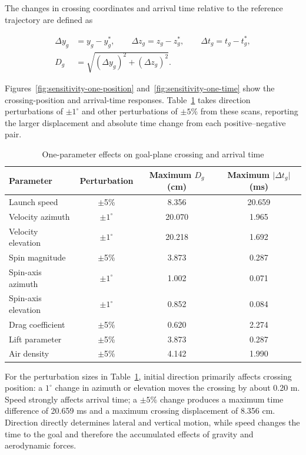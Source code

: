 \documentclass[12pt,letterpaper]{article}
\begin{document}
The changes in crossing coordinates and arrival time relative to the reference trajectory are defined as


\begin{equation}
\begin{aligned}
\Delta y_g&=y_g-y_g^*,\qquad
\Delta z_g=z_g-z_g^*,\qquad
\Delta t_g=t_g-t_g^*,\\
D_g&=\sqrt{(\Delta y_g)^2+(\Delta z_g)^2}.
\end{aligned}
\label{eq:sensitivity-displacement}
\end{equation}

Figures~\ref{fig:sensitivity-one-position} and~\ref{fig:sensitivity-one-time} show the crossing-position and arrival-time responses. Table~\ref{tab:sensitivity-one-factor} takes direction perturbations of $\pm1^\circ$ and other perturbations of $\pm5\%$ from these scans, reporting the larger displacement and absolute time change from each positive--negative pair.


\begin{table}[H]
\centering
\small
\renewcommand{\arraystretch}{1.16}
\caption{One-parameter effects on goal-plane crossing and arrival time}
\begin{tabular}{lccc}
\toprule
Parameter & Perturbation & Maximum $D_g$ (cm) & Maximum $\lvert\Delta t_g\rvert$ (ms)\\
\midrule
Launch speed & $\pm$5\% & 8.356 & 20.659\\
Velocity azimuth & $\pm$$1^\circ$ & 20.070 & 1.965\\
Velocity elevation & $\pm$$1^\circ$ & 20.218 & 1.692\\
Spin magnitude & $\pm$5\% & 3.873 & 0.287\\
Spin-axis azimuth & $\pm$$1^\circ$ & 1.002 & 0.071\\
Spin-axis elevation & $\pm$$1^\circ$ & 0.852 & 0.084\\
Drag coefficient & $\pm$5\% & 0.620 & 2.274\\
Lift parameter & $\pm$5\% & 3.873 & 0.287\\
Air density & $\pm$5\% & 4.142 & 1.990\\
\bottomrule
\end{tabular}
\label{tab:sensitivity-one-factor}
\end{table}

For the perturbation sizes in Table~\ref{tab:sensitivity-one-factor}, initial direction primarily affects crossing position: a $1^\circ$ change in azimuth or elevation moves the crossing by about 0.20 m. Speed strongly affects arrival time; a $\pm5\%$ change produces a maximum time difference of 20.659 ms and a maximum crossing displacement of 8.356 cm. Direction directly determines lateral and vertical motion, while speed changes the time to the goal and therefore the accumulated effects of gravity and aerodynamic forces.
\end{document}
